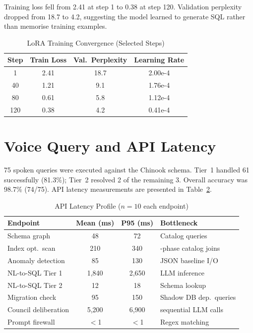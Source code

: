 \documentclass[12pt,a4paper]{report}
\begin{document}
Training loss fell from 2.41 at step 1 to 0.38 at step 120. Validation perplexity dropped from 18.7 to 4.2, suggesting the model learned to generate SQL rather than memorise training examples.

\begin{table}[htbp]
\caption{LoRA Training Convergence (Selected Steps)}
\label{tab:finetune}
\centering
\begin{tabular}{cccc}
\toprule
\textbf{Step} & \textbf{Train Loss} & \textbf{Val.\ Perplexity} & \textbf{Learning Rate} \\
\midrule
1   & 2.41 & 18.7 & 2.00e-4 \\
40  & 1.21 & 9.1  & 1.76e-4 \\
80  & 0.61 & 5.8  & 1.12e-4 \\
120 & 0.38 & 4.2  & 0.41e-4 \\
\bottomrule
\end{tabular}
\end{table}

\section{Voice Query and API Latency}

75 spoken queries were executed against the Chinook schema. Tier~1 handled 61 successfully (81.3\%); Tier~2 resolved 2 of the remaining 3. Overall accuracy was 98.7\% (74/75). API latency measurements are presented in Table~\ref{tab:latency}.

\begin{table}[htbp]
\caption{API Latency Profile ($n=10$ each endpoint)}
\label{tab:latency}
\centering
\begin{tabular}{>{\raggedright}p{3.5cm} c c >{\raggedright\arraybackslash}p{2.5cm}}
\toprule
\textbf{Endpoint} & \textbf{Mean (ms)} & \textbf{P95 (ms)} & \textbf{Bottleneck} \\
\midrule
Schema graph        & 48    & 72    & Catalog queries \\
Index opt.\ scan    & 210   & 340   & 3-phase catalog joins \\
Anomaly detection   & 85    & 130   & JSON baseline I/O \\
NL-to-SQL Tier 1    & 1,840 & 2,650 & LLM inference \\
NL-to-SQL Tier 2    & 12    & 18    & Schema lookup \\
Migration check     & 95    & 150   & Shadow DB dep.\ queries \\
Council deliberation & 5,200 & 6,900 & 3 sequential LLM calls \\
Prompt firewall     & $<$1  & $<$1  & Regex matching \\
\bottomrule
\end{tabular}
\end{table}
\end{document}
